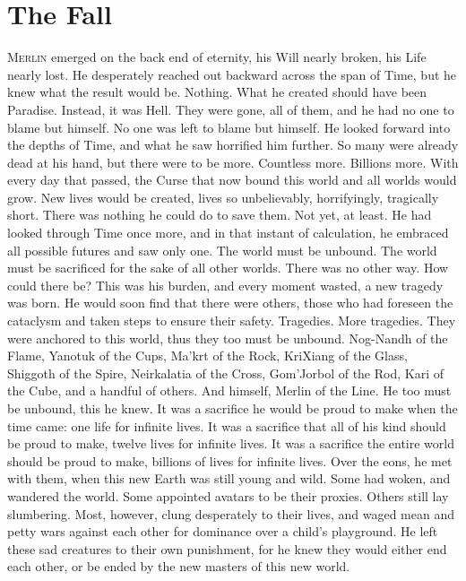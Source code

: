 \chapter{The Fall}


\lettrine{M}{erlin} emerged on the back end of eternity, his Will nearly broken, his Life nearly lost. He desperately reached out backward across the span of Time, but he knew what the result would be. Nothing. What he created should have been Paradise. Instead, it was Hell. They were gone, all of them, and he had no one to blame but himself. No one was left to blame but himself.
\SomeVSpace
He looked forward into the depths of Time, and what he saw horrified him further. So many were already dead at his hand, but there were to be more. Countless more. Billions more. With every day that passed, the Curse that now bound this world and all worlds would grow. New lives would be created, lives so unbelievably, horrifyingly, tragically short. There was nothing he could do to save them.
\SomeVSpace
Not yet, at least.
\SomeVSpace
He had looked through Time once more, and in that instant of calculation, he embraced all possible futures and saw only one. The world must be unbound. The world must be sacrificed for the sake of all other worlds. There was no other way. How could there be? This was his burden, and every moment wasted, a new tragedy was born.
\SomeVSpace
He would soon find that there were others, those who had foreseen the cataclysm and taken steps to ensure their safety. Tragedies. More tragedies. They were anchored to this world, thus they too must be unbound. Nog-Nandh of the Flame, Yanotuk of the Cups, Ma’krt of the Rock, KriXiang of the Glass, Shiggoth of the Spire, Neirkalatia of the Cross, Gom’Jorbol of the Rod, Kari of the Cube, and a handful of others.
\SomeVSpace
And himself, Merlin of the Line. He too must be unbound, this he knew. It was a sacrifice he would be proud to make when the time came: one life for infinite lives. It was a sacrifice that all of his kind should be proud to make, twelve lives for infinite lives. It was a sacrifice the entire world should be proud to make, billions of lives for infinite lives.
\SomeVSpace
Over the eons, he met with them, when this new Earth was still young and wild. Some had woken, and wandered the world. Some appointed avatars to be their proxies. Others still lay slumbering. Most, however, clung desperately to their lives, and waged mean and petty wars against each other for dominance over a child’s playground. He left these sad creatures to their own punishment, for he knew they would either end each other, or be ended by the new masters of this new world.
